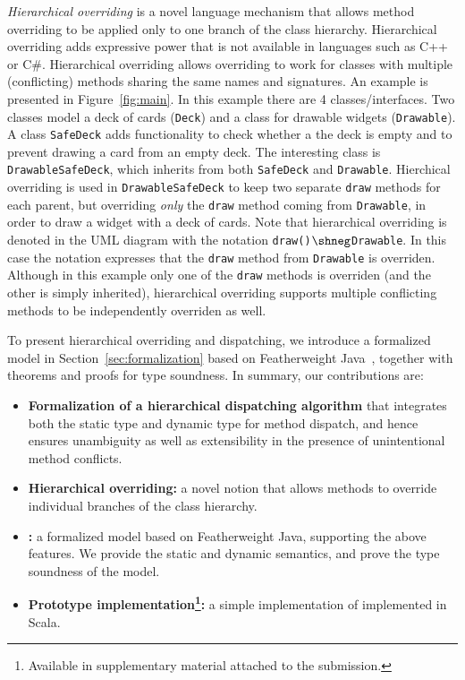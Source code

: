 \textit{Hierarchical overriding} is a novel language
mechanism that allows method overriding to be applied
only to one branch of the class hierarchy. Hierarchical overriding 
adds expressive power that is not available in languages such as 
C++ or C\#. Hierarchical overriding allows overriding to work 
for classes with multiple (conflicting) methods sharing the 
same names and signatures. An example is presented in 
Figure~\ref{fig:main}. In this example there are 4 classes/interfaces.
Two classes model a deck of cards (\lstinline|Deck|) and a class for
drawable widgets (\lstinline|Drawable|). 
A class \lstinline|SafeDeck| adds functionality to check whether a 
the deck is empty and to prevent drawing a card from an empty deck. 
The interesting class is \lstinline|DrawableSafeDeck|, which inherits 
from both \lstinline|SafeDeck| and \lstinline|Drawable|. Hierchical
overriding is used in \lstinline|DrawableSafeDeck| to keep two separate \lstinline|draw|
methods for each parent, but overriding \emph{only} the \lstinline|draw|
method coming from \lstinline|Drawable|, in order to draw a widget
with a deck of cards. Note that hierarchical overriding is denoted in the UML
diagram with the notation
\lstinline|draw()|$\shneg$\lstinline|Drawable|. In this case the
notation expresses that the \lstinline|draw| method from \lstinline|Drawable|
is overriden. Although in this example only one of the
\lstinline|draw| methods is overriden (and the other is simply inherited), hierarchical overriding
supports multiple conflicting methods to be independently overriden as well.


To present hierarchical overriding and dispatching, we introduce a
formalized model \MIM{} in Section~\ref{sec:formalization} based on
Featherweight Java~\cite{Igarashi01FJ}, together with theorems and
proofs for type soundness. 
In summary, our contributions are:
\begin{itemize}
	\item \textbf{Formalization of a hierarchical dispatching algorithm} that integrates both the static type and dynamic type for method dispatch, and hence
	ensures unambiguity as well as extensibility in the presence
        of unintentional method conflicts.
	\item \textbf{Hierarchical overriding:} a novel notion that allows
          methods to override individual branches of the class hierarchy.
	\item \textbf{\name:} a formalized model based on
          Featherweight Java, supporting the above features. 
          We provide the static and dynamic semantics, and prove the
          type soundness of the model.
	\item \textbf{Prototype implementation\footnote{Available in
              supplementary material attached to the submission.}:} a
          simple implementation of \MIM{} implemented in Scala.
\end{itemize}

 